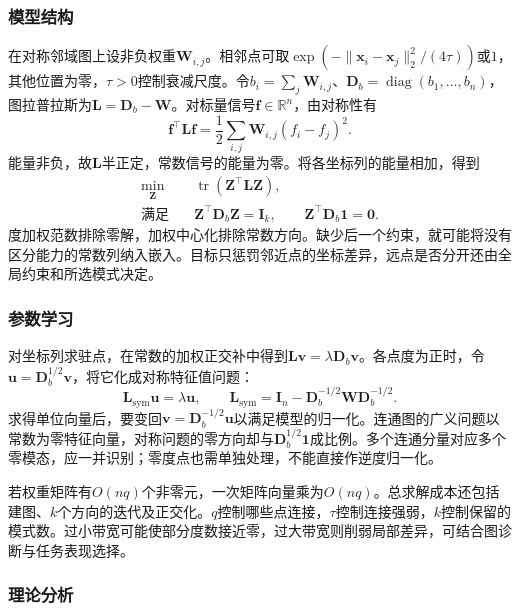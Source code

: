 \subsubsection{模型结构}

在对称邻域图上设非负权重$\bm{W}_{i,j}$。相邻点可取$\exp(-\lVert\bm{x}_i-\bm{x}_j\rVert_2^2/(4\tau))$或$1$，其他位置为零，$\tau>0$控制衰减尺度。令$b_i=\sum_j\bm{W}_{i,j}$、$\bm{D}_b=\operatorname{diag}(b_1,\ldots,b_n)$，图拉普拉斯为$\bm{L}=\bm{D}_b-\bm{W}$。对标量信号$\bm{f}\in\mathbb{R}^n$，由对称性有
\begin{equation}
  \label{eq:dim-le-energy}
  \bm{f}^{\top}\bm{L}\bm{f}
  =\frac12\sum_{i,j}\bm{W}_{i,j}(f_i-f_j)^2.
\end{equation}
能量非负，故$\bm{L}$半正定，常数信号的能量为零。将各坐标列的能量相加，得到
\begin{equation}
  \label{eq:dim-le-objective}
  \begin{aligned}
    \min_{\bm{Z}}\quad&
      \operatorname{tr}(\bm{Z}^{\top}\bm{L}\bm{Z}),\\
    \text{满足}\quad&
      \bm{Z}^{\top}\bm{D}_b\bm{Z}=\bm{I}_k,\qquad
      \bm{Z}^{\top}\bm{D}_b\bm{1}=\bm{0}.
  \end{aligned}
\end{equation}
度加权范数排除零解，加权中心化排除常数方向。缺少后一个约束，就可能将没有区分能力的常数列纳入嵌入。目标只惩罚邻近点的坐标差异，远点是否分开还由全局约束和所选模式决定。

\subsubsection{参数学习}

对坐标列求驻点，在常数的加权正交补中得到$\bm{L}\bm{v}=\lambda\bm{D}_b\bm{v}$。各点度为正时，令$\bm{u}=\bm{D}_b^{1/2}\bm{v}$，将它化成对称特征值问题：
\[
  \bm{L}_{\mathrm{sym}}\bm{u}=\lambda\bm{u},
  \qquad
  \bm{L}_{\mathrm{sym}}
  =\bm{I}_n-\bm{D}_b^{-1/2}\bm{W}\bm{D}_b^{-1/2}.
\]
求得单位向量后，要变回$\bm{v}=\bm{D}_b^{-1/2}\bm{u}$以满足模型的归一化。连通图的广义问题以常数为零特征向量，对称问题的零方向却与$\bm{D}_b^{1/2}\bm{1}$成比例。多个连通分量对应多个零模态，应一并识别；零度点也需单独处理，不能直接作逆度归一化。

若权重矩阵有$O(nq)$个非零元，一次矩阵向量乘为$O(nq)$。总求解成本还包括建图、$k$个方向的迭代及正交化。$q$控制哪些点连接，$\tau$控制连接强弱，$k$控制保留的模式数。过小带宽可能使部分度数接近零，过大带宽则削弱局部差异，可结合图诊断与任务表现选择。

\subsubsection{理论分析}
\label{sec:dim-le-theory}

